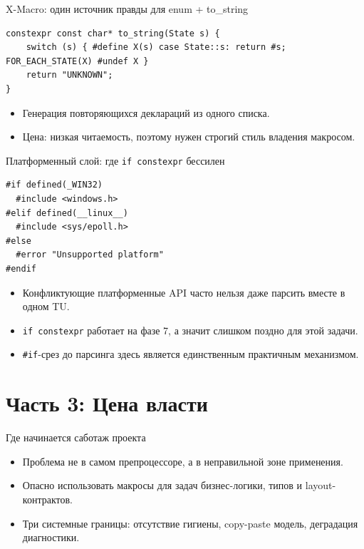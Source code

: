 \documentclass{beamer}
\begin{document}
\begin{frame}[fragile]{X-Macro: один источник правды для enum + to\_string}
\begin{lstlisting}
constexpr const char* to_string(State s) {
    switch (s) { #define X(s) case State::s: return #s; FOR_EACH_STATE(X) #undef X }
    return "UNKNOWN";
}
\end{lstlisting}
    \begin{itemize}
        \item Генерация повторяющихся деклараций из одного списка.
        \item Цена: низкая читаемость, поэтому нужен строгий стиль владения макросом.
    \end{itemize}
\end{frame}


\begin{frame}[fragile]{Платформенный слой: где \texttt{if constexpr} бессилен}
\begin{lstlisting}
#if defined(_WIN32)
  #include <windows.h>
#elif defined(__linux__)
  #include <sys/epoll.h>
#else
  #error "Unsupported platform"
#endif
\end{lstlisting}
    \begin{itemize}
        \item Конфликтующие платформенные API часто нельзя даже парсить вместе в одном TU.
        \item \texttt{if constexpr} работает на фазе 7, а значит слишком поздно для этой задачи.
        \item \texttt{\#if}-срез до парсинга здесь является единственным практичным механизмом.
    \end{itemize}
\end{frame}

\section{Часть 3: Цена власти}

\begin{frame}{Где начинается саботаж проекта}
    \begin{itemize}
        \item Проблема не в самом препроцессоре, а в неправильной зоне применения.
        \item Опасно использовать макросы для задач бизнес-логики, типов и layout-контрактов.
        \item Три системные границы: отсутствие гигиены, copy-paste модель, деградация диагностики.
    \end{itemize}
\end{frame}
\end{document}
